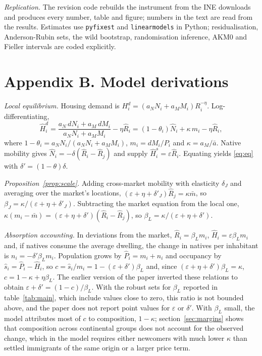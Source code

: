 \documentclass[11pt,a4paper]{article}
\begin{document}
\textit{Replication.} The revision code rebuilds the instrument from the INE downloads and produces every number, table and figure; numbers in the text are read from the results. Estimates use \texttt{pyfixest} and \texttt{linearmodels} in Python; residualisation, Anderson-Rubin sets, the wild bootstrap, randomisation inference, AKM0 and Fieller intervals are coded explicitly.

\clearpage
\section*{Appendix B. Model derivations}

\textit{Local equilibrium.} Housing demand is $H_i^d=(a_NN_i+a_MM_i)R_i^{-\eta}$. Log-differentiating,
\[
\hat H_i^d=\frac{a_N\,dN_i+a_M\,dM_i}{a_NN_i+a_MM_i}-\eta\hat R_i=(1-\theta_i)\hat N_i+\kappa\,m_i-\eta\hat R_i,
\]
where $1-\theta_i=a_NN_i/(a_NN_i+a_MM_i)$, $m_i=dM_i/P_i$ and $\kappa=a_M/\bar a$. Native mobility gives $\hat N_i=-\delta(\hat R_i-\hat R_j)$ and supply $\hat H_i^s=\varepsilon\hat R_i$. Equating yields \eqref{eq:eq} with $\delta'=(1-\theta)\delta$.

\textit{Proposition~\ref{prop:scale}.} Adding cross-market mobility with elasticity $\delta_J$ and averaging over the market's locations, $(\varepsilon+\eta+\delta'_J)\hat R_j=\kappa\bar m$, so $\beta_J=\kappa/(\varepsilon+\eta+\delta'_J)$. Subtracting the market equation from the local one, $\kappa(m_i-\bar m)=(\varepsilon+\eta+\delta')(\hat R_i-\hat R_j)$, so $\beta_L=\kappa/(\varepsilon+\eta+\delta')$.

\textit{Absorption accounting.} In deviations from the market, $\hat R_i=\beta_Lm_i$, $\hat H_i=\varepsilon\beta_Lm_i$ and, if natives consume the average dwelling, the change in natives per inhabitant is $n_i=-\delta'\beta_Lm_i$. Population grows by $\hat P_i=m_i+n_i$ and occupancy by $\hat s_i=\hat P_i-\hat H_i$, so $c=\hat s_i/m_i=1-(\varepsilon+\delta')\beta_L$ and, since $(\varepsilon+\eta+\delta')\beta_L=\kappa$, $c=1-\kappa+\eta\beta_L$. The earlier version of the paper inverted these relations to obtain $\varepsilon+\delta'=(1-c)/\beta_L$. With the robust sets for $\beta_L$ reported in table~\ref{tab:main}, which include values close to zero, this ratio is not bounded above, and the paper does not report point values for $\varepsilon$ or $\delta'$. With $\beta_L$ small, the model attributes most of $c$ to composition, $1-\kappa$; section~\ref{sec:margins} shows that composition across continental groups does not account for the observed change, which in the model requires either newcomers with much lower $\kappa$ than settled immigrants of the same origin or a larger price term.
\end{document}
